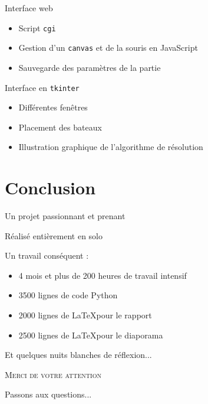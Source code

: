 \begin{frame}{Interface web}
\begin{itemize}
\item Script \texttt{cgi}\pause
\item Gestion d'un \texttt{canvas} et de la souris en JavaScript\pause
\item Sauvegarde des paramètres de la partie
\end{itemize}

\end{frame}

\begin{frame}{Interface en \texttt{tkinter}}
\begin{itemize}
\item Différentes fenêtres\pause
\item Placement des bateaux\pause
\item Illustration graphique de l'algorithme de résolution
\end{itemize}
\end{frame}

\section{Conclusion}
\begin{frame}
Un projet passionnant et prenant\pause

\medskip

Réalisé entièrement en solo\pause

\medskip

Un travail conséquent :\pause

\begin{itemize}
\item 4 mois et plus de 200 heures de travail intensif\\ \pause
\item 3500 lignes de code Python\\ \pause
\item 2000 lignes de \LaTeX pour le rapport\\ \pause
\item 2500  lignes de \LaTeX pour le diaporama\\ \pause
\end{itemize}
Et quelques nuits blanches de réflexion...
\end{frame}

\begin{frame}{}

\begin{center}
\textsc{\Huge Merci de votre attention}

\bigskip
Passons aux questions...


\end{center}
\end{frame}



